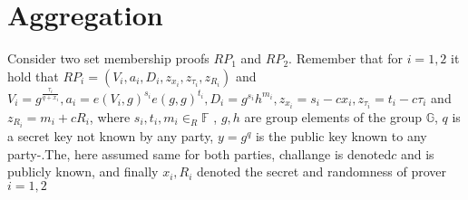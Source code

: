 \chapter{Aggregation }
\label{appendix:aggregate_a}
Consider two set membership proofs $RP_1$ and $RP_2$. Remember that for $i=1,2$ it hold that $RP_i = (V_i,a_i,D_i,z_{x_i},z_{\tau_i},z_{R_i})$ and $V_i =  g^{\frac{\tau_i}{q+x_i}},
a_i = e(V_i,g)^{s_i}e(g,g)^{t_i},
D_i =  g^{s_i}h^{m_i},
z_{x_i} =  s_i- c x_i, 
z_{\tau_i} = t_i- c \tau_i$ and 
$z_{R_i} =  m_i+ c R_i$, 
where $s_i,t_i,m_i \in_R \mathds{F}$ ,  $g,h$ are group elements of the group $\mathds{G}$, $q$ is a secret key not known by any party, $y=g^q$ is the public key known to any party-.The, here assumed same for both parties, challange is denoted$c$ and is publicly known, and finally $x_i, R_i$ denoted the secret and randomness of prover $i=1,2$ 

